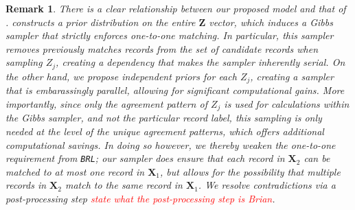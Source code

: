\documentclass[12pt,letterpaper]{article}
\newcommand{\1}[1]{\mathbb{I}\!\left[#1\right]} %
\newtheorem*{remark}{Remark}
\begin{document}
\begin{remark}
There is a clear relationship between our proposed model and that of \cite{sadinle_bayesian_2017}. 
\cite{sadinle_bayesian_2017} constructs a prior distribution on the entire \(\mathbf{Z}\) vector, 
which induces a Gibbs
sampler that strictly enforces one-to-one matching. In particular, this
sampler removes previously matches records from the set of candidate
records when sampling \(Z_j\), creating a dependency that makes the
sampler \emph{inherently serial}. On the other hand, we propose 
 independent priors for
each \(Z_j\), creating a sampler that is \emph{embarassingly parallel}, allowing for significant computational gains. 
More importantly, since only the agreement pattern of \(Z_j\) is used for
calculations within the Gibbs sampler, and not the particular record
label, this sampling is only needed at the level of the unique agreement patterns, which offers additional computational savings.  In doing so however, we thereby weaken the one-to-one requirement from
\texttt{BRL}; our sampler does ensure that each record in \(\bm{X}_2\) can be
matched to at most one record in \(\bm{X}_1\), but allows for the possibility
that multiple records in \(\bm{X}_2\) match to the same record in \(\bm{X}_1\). We resolve contradictions via a post-processing step \textcolor{red}{state what the post-processing step is Brian}. 
\end{remark}


\newpage


\end{document}

